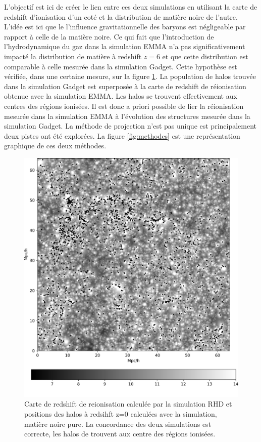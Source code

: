 L'objectif est ici de créer le lien entre ces deux simulations en utilisant la carte de redshift d'ionisation d'un coté et la distribution de matière noire de l'autre.
L'idée est ici que le l'influence gravitationnelle des baryons est négligeable par rapport à celle de la matière noire.
Ce qui fait que l'introduction de l'hydrodynamique du gaz dans la simulation EMMA n'a pas significativement impacté la distribution de matière à redshift $z=6$ et que cette distribution est comparable à celle mesurée dans la simulation Gadget.
Cette hypothèse est vérifiée, dans une certaine mesure, sur la figure \ref{fig:zmapcomp}.
La population de halos trouvée dans la simulation Gadget est superposée à la carte de redshift de réionisation obtenue avec la simulation EMMA.
Les halos se trouvent effectivement aux centres des régions ionisées.
Il est donc a priori possible de lier la réionisation mesurée dans la simulation EMMA à l'évolution des structures mesurée dans la simulation Gadget.
La méthode de projection n'est pas unique est principalement deux pistes ont été explorées.
La figure \ref{fig:methodes} est une représentation graphique de ces deux méthodes.


\begin{figure}
		\centering
        \includegraphics[width=.95\linewidth]{img/05/maphaloh.pdf} 
        \caption[Carte de redshift et halos]{Carte de redshift de reionisation calculée par la simulation \ac{RHD} et positions des halos à redsihft z=0 calculées avec la simulation, matière noire pure.
        La concordance des deux simulations est correcte, les halos de trouvent aux centre des régions ionisées.
		\label{fig:zmapcomp}}
\end{figure}

